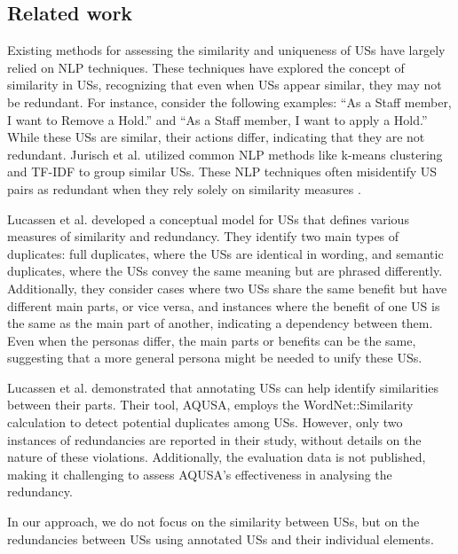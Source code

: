 \subsection{Related work}\label{redundancy_related_work}
Existing methods for assessing the similarity and uniqueness of USs have largely relied on NLP techniques. These techniques have explored the concept of similarity in USs, recognizing that even when USs appear similar, they may not be redundant. For instance, consider the following examples: “As a Staff member, I want to Remove a Hold.” and “As a Staff member, I want to apply a Hold.” While these USs are similar, their actions differ, indicating that they are not redundant. Jurisch et al. utilized common NLP methods like k-means clustering and TF-IDF to group similar USs\cite{ duszkiewicz2022identifying}. These NLP techniques often misidentify US pairs as redundant when they rely solely on similarity measures \cite{duszkiewicz2022identifying,jurischsimilarity,levin1993english}.

Lucassen et al. developed a conceptual model for USs that defines various measures of similarity and redundancy. They identify two main types of duplicates: full duplicates, where the USs are identical in wording, and semantic duplicates, where the USs convey the same meaning but are phrased differently. Additionally, they consider cases where two USs share the same benefit but have different main parts, or vice versa, and instances where the benefit of one US is the same as the main part of another, indicating a dependency between them. Even when the personas differ, the main parts or benefits can be the same, suggesting that a more general persona might be needed to unify these USs\cite{Lucassen2015}.

Lucassen et al. demonstrated that annotating USs can help identify similarities between their parts. Their tool, AQUSA, employs the WordNet::Similarity calculation to detect potential duplicates among USs. However, only two instances of redundancies are reported in their study, without details on the nature of these violations. Additionally, the evaluation data is not published, making it challenging to assess AQUSA's effectiveness in analysing the redundancy.

In our approach, we do not focus on the similarity between USs, but on the redundancies between USs using annotated USs and their individual elements. 
